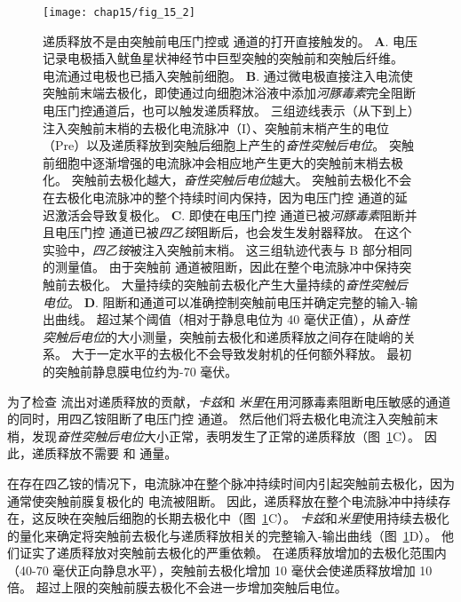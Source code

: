 \begin{figure}[htbp]
	\centering
	\texttt{[image: chap15/fig\_15\_2]}
	\caption{递质释放不是由突触前电压门控或  通道的打开直接触发的\cite{katz1967study}。
	\textbf{A}. 电压记录电极插入鱿鱼星状神经节中巨型突触的突触前和突触后纤维。
	电流通过电极也已插入突触前细胞。
	\textbf{B}. 通过微电极直接注入电流使突触前末端去极化，即使通过向细胞沐浴液中添加\textit{河豚毒素}完全阻断电压门控通道后，也可以触发递质释放。
	三组迹线表示（从下到上）注入突触前末梢的去极化电流脉冲（I）、突触前末梢产生的电位（Pre）以及递质释放到突触后细胞上产生的\textit{奋性突触后电位}。
	突触前细胞中逐渐增强的电流脉冲会相应地产生更大的突触前末梢去极化。
	突触前去极化越大，\textit{奋性突触后电位}越大。
	突触前去极化不会在去极化电流脉冲的整个持续时间内保持，因为电压门控  通道的延迟激活会导致复极化。
	\textbf{C}. 即使在电压门控  通道已被\textit{河豚毒素}阻断并且电压门控  通道已被\textit{四乙铵}阻断后，也会发生发射器释放。
	在这个实验中，\textit{四乙铵}被注入突触前末梢。
	这三组轨迹代表与 B 部分相同的测量值。
	由于突触前  通道被阻断，因此在整个电流脉冲中保持突触前去极化。
	大量持续的突触前去极化产生大量持续的\textit{奋性突触后电位}。
	\textbf{D}. 阻断和通道可以准确控制突触前电压并确定完整的输入-输出曲线。
	超过某个阈值（相对于静息电位为 40 毫伏正值），从\textit{奋性突触后电位}的大小测量，突触前去极化和递质释放之间存在陡峭的关系。
	大于一定水平的去极化不会导致发射机的任何额外释放。
	最初的突触前静息膜电位约为-70 毫伏。}
	\label{fig:15_2}
\end{figure}


为了检查  流出对递质释放的贡献，\textit{卡兹}和 \textit{米里}在用河豚毒素阻断电压敏感的通道的同时，用四乙铵阻断了电压门控  通道。
然后他们将去极化电流注入突触前末梢，发现\textit{奋性突触后电位}大小正常，表明发生了正常的递质释放（图~\ref{fig:15_2}C）。
因此，递质释放不需要  和  通量。


在存在四乙铵的情况下，电流脉冲在整个脉冲持续时间内引起突触前去极化，因为通常使突触前膜复极化的  电流被阻断。
因此，递质释放在整个电流脉冲中持续存在，这反映在突触后细胞的长期去极化中（图~\ref{fig:15_2}C）。
\textit{卡兹}和\textit{米里}使用持续去极化的量化来确定将突触前去极化与递质释放相关的完整输入-输出曲线（图~\ref{fig:15_2}D）。
他们证实了递质释放对突触前去极化的严重依赖。
在递质释放增加的去极化范围内（40-70 毫伏正向静息水平），突触前去极化增加 10 毫伏会使递质释放增加 10 倍。
超过上限的突触前膜去极化不会进一步增加突触后电位。



